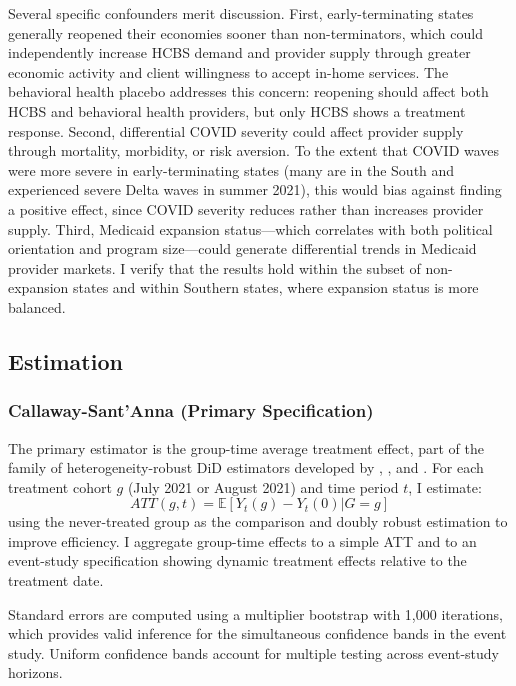 \documentclass[12pt]{article}
\newcommand{\E}{\mathbb{E}}
\begin{document}
Several specific confounders merit discussion. First, early-terminating states generally reopened their economies sooner than non-terminators, which could independently increase HCBS demand and provider supply through greater economic activity and client willingness to accept in-home services. The behavioral health placebo addresses this concern: reopening should affect both HCBS and behavioral health providers, but only HCBS shows a treatment response. Second, differential COVID severity could affect provider supply through mortality, morbidity, or risk aversion. To the extent that COVID waves were more severe in early-terminating states (many are in the South and experienced severe Delta waves in summer 2021), this would bias against finding a positive effect, since COVID severity reduces rather than increases provider supply. Third, Medicaid expansion status---which correlates with both political orientation and program size---could generate differential trends in Medicaid provider markets. I verify that the results hold within the subset of non-expansion states and within Southern states, where expansion status is more balanced.

\subsection{Estimation}

\subsubsection{Callaway-Sant'Anna (Primary Specification)}

The primary estimator is the \citet{callaway2021} group-time average treatment effect, part of the family of heterogeneity-robust DiD estimators developed by \citet{dechaisemartin2020}, \citet{sun2021}, and \citet{borusyak2024}. For each treatment cohort $g$ (July 2021 or August 2021) and time period $t$, I estimate:
\begin{equation}
ATT(g,t) = \E[Y_t(g) - Y_t(0) | G = g]
\end{equation}
using the never-treated group as the comparison and doubly robust estimation to improve efficiency. I aggregate group-time effects to a simple ATT and to an event-study specification showing dynamic treatment effects relative to the treatment date.

Standard errors are computed using a multiplier bootstrap with 1,000 iterations, which provides valid inference for the simultaneous confidence bands in the event study. Uniform confidence bands account for multiple testing across event-study horizons.
\end{document}
